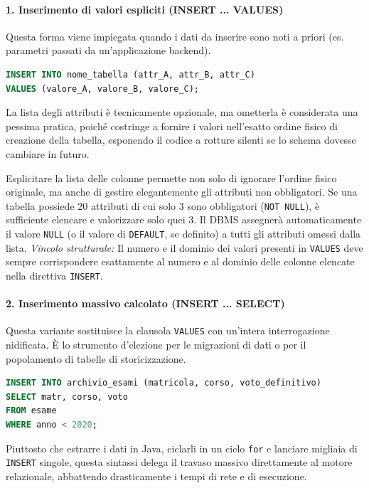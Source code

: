 \paragraph{1. Inserimento di valori espliciti (INSERT ... VALUES)}
Questa forma viene impiegata quando i dati da inserire sono noti a priori (es. parametri passati da un'applicazione backend).

\begin{lstlisting}[language=SQL, basicstyle=\ttfamily\small, keywordstyle=\color{blue}\bfseries]
INSERT INTO nome_tabella (attr_A, attr_B, attr_C)
VALUES (valore_A, valore_B, valore_C);
\end{lstlisting}

La lista degli attributi è tecnicamente opzionale, ma ometterla è considerata una pessima pratica, poiché costringe a fornire i valori nell'esatto ordine fisico di creazione della tabella, esponendo il codice a rotture silenti se lo schema dovesse cambiare in futuro.

\begin{observation}
Esplicitare la lista delle colonne permette non solo di ignorare l'ordine fisico originale, ma anche di gestire elegantemente gli attributi non obbligatori. Se una tabella possiede 20 attributi di cui solo 3 sono obbligatori (\texttt{NOT NULL}), è sufficiente elencare e valorizzare solo quei 3. Il DBMS assegnerà automaticamente il valore \texttt{NULL} (o il valore di \texttt{DEFAULT}, se definito) a tutti gli attributi omessi dalla lista.
\textit{Vincolo strutturale:} Il numero e il dominio dei valori presenti in \texttt{VALUES} deve sempre corrispondere esattamente al numero e al dominio delle colonne elencate nella direttiva \texttt{INSERT}.
\end{observation}

\paragraph{2. Inserimento massivo calcolato (INSERT ... SELECT)}
Questa variante sostituisce la clausola \texttt{VALUES} con un'intera interrogazione nidificata. È lo strumento d'elezione per le migrazioni di dati o per il popolamento di tabelle di storicizzazione.

\begin{example}
\begin{lstlisting}[language=SQL, basicstyle=\ttfamily\small, keywordstyle=\color{blue}\bfseries]
INSERT INTO archivio_esami (matricola, corso, voto_definitivo)
SELECT matr, corso, voto
FROM esame
WHERE anno < 2020;
\end{lstlisting}
Piuttosto che estrarre i dati in Java, ciclarli in un ciclo \texttt{for} e lanciare migliaia di \texttt{INSERT} singole, questa sintassi delega il travaso massivo direttamente al motore relazionale, abbattendo drasticamente i tempi di rete e di esecuzione.
\end{example}

